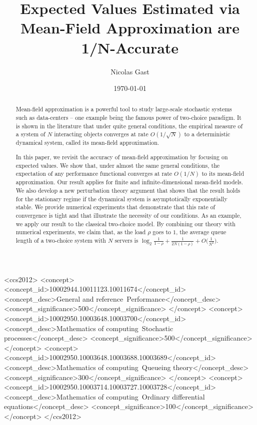 \documentclass[sigconf]{acmart}
\title{Expected Values Estimated via Mean-Field Approximation are
  1/N-Accurate}
\author{Nicolas Gast}
\affiliation{%
  \institution{Inria}%
  \streetaddress{Univ. Grenoble Alpes, CNRS, LIG}%
  \city{ Grenoble} %
  \state{France} %
  \postcode{F-38000}%
}%
\date{\today}
\begin{document}
\begin{abstract}
  Mean-field approximation is a powerful tool to study large-scale
  stochastic systems such as data-centers -- one example being the
  famous power of two-choice paradigm.  It is shown in the literature
  that under quite general conditions, the empirical measure of a
  system of $N$ interacting objects converges at rate $O(1/\sqrt{N})$
  to a deterministic dynamical system, called its mean-field
  approximation.

  In this paper, we revisit the accuracy of mean-field approximation
  by focusing on expected values.  We show that, under almost the same
  general conditions, the expectation of any performance functional
  converges at rate $O(1/N)$ to its mean-field approximation.  Our
  result applies for finite and infinite-dimensional mean-field
  models. We also develop a new perturbation theory argument that
  shows that the result holds for the stationary regime if the
  dynamical system is asymptotically exponentially stable.  We provide
  numerical experiments that demonstrate that this rate of convergence
  is tight and that illustrate the necessity of our conditions.  As an
  example, we apply our result to the classical two-choice model. By
  combining our theory with numerical experiments, we claim that, as
  the load $\rho$ goes to $1$, the average queue length of a
  two-choice system with $N$ servers is
  $\log_2\frac1{1-\rho} + \frac1{2N(1-\rho)}
  +O\big(\frac1{N^2}\big)$.
\end{abstract}

\begin{CCSXML}
<ccs2012>
<concept>
<concept_id>10002944.10011123.10011674</concept_id>
<concept_desc>General and reference~Performance</concept_desc>
<concept_significance>500</concept_significance>
</concept>
<concept>
<concept_id>10002950.10003648.10003700</concept_id>
<concept_desc>Mathematics of computing~Stochastic processes</concept_desc>
<concept_significance>500</concept_significance>
</concept>
<concept>
<concept_id>10002950.10003648.10003688.10003689</concept_id>
<concept_desc>Mathematics of computing~Queueing theory</concept_desc>
<concept_significance>300</concept_significance>
</concept>
<concept>
<concept_id>10002950.10003714.10003727.10003728</concept_id>
<concept_desc>Mathematics of computing~Ordinary differential equations</concept_desc>
<concept_significance>100</concept_significance>
</concept>
</ccs2012>
\end{CCSXML}

\end{document}
